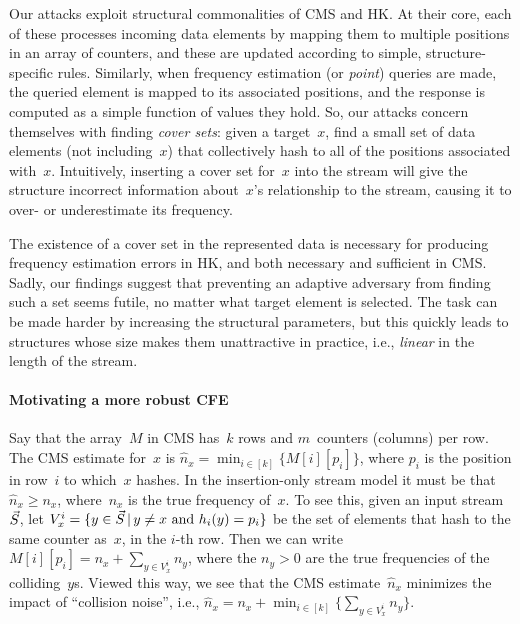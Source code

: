 Our attacks exploit structural commonalities of CMS and HK.  At their core, each of these processes incoming data elements by mapping them to multiple positions in an array of counters, and these are updated according to simple, structure-specific rules. Similarly, 
when frequency estimation (or \emph{point}) queries are made, the queried element is mapped to its associated positions, and the response is computed as a simple function of values they hold.  So, our attacks concern themselves with finding \emph{cover sets}: given a target~$x$, find a small set of data elements (not including~$x$) that collectively hash to all of the positions associated with~$x$. Intuitively, inserting a cover set for~$x$ into the stream will give the structure incorrect information about~$x$'s relationship to the stream, causing it to over- or underestimate its frequency. 

The existence of a cover set in the represented data is necessary for producing frequency estimation errors in HK, and both necessary and sufficient in CMS.  Sadly, our findings suggest that preventing an adaptive adversary from finding such a set seems futile, no matter what target element is selected.  The task can be made harder by increasing the structural parameters, but this quickly leads to structures whose size makes them unattractive in practice, i.e., \emph{linear} in the length of the stream.

\paragraph{Motivating a more robust CFE} Say that the array~$M$ in CMS has~$k$ rows and $m$~counters (columns) per row.
The CMS estimate for~$x$ is $\hat{n}_x=\min_{i \in [k]} \{M[i][p_i]\}$, where $p_i$ is the position in row~$i$ to which~$x$ hashes.  In the insertion-only stream model it must be that $\hat{n}_x \geq n_x$, where~$n_x$ is the true frequency of~$x$. To see this, given an input stream~$\vec{S}$,
let $V^{i}_{x}=\{y \in \vec{S} \,|\, y\neq x \mbox{ and } h_i(y)=p_i\}$ be the set of elements that hash to the same counter as~$x$, in the $i$-th row.  Then we can write $M[i][p_i]=n_x + \sum_{y \in V^i_x }n_y$, where the $n_y > 0$ are the true frequencies of the colliding~$y$s.
Viewed this way, we see that the CMS estimate~$\hat{n}_x$ minimizes the impact of ``collision noise'', i.e., 
$\hat{n}_x = n_x + \min_{i \in [k]}\{\sum_{y \in V^i_x }n_y\}$.  


